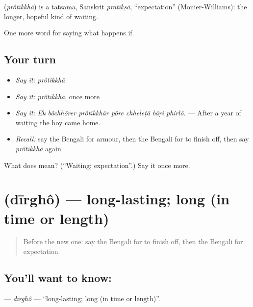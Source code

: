 \begin{cousinweb}
\textbf{} (\emph{prôtīkkhā}) is a tatsama, Sanskrit \emph{pratīkṣā}, \textquotedblleft{}expectation\textquotedblright{} (Monier-Williams): the longer, hopeful kind of waiting.
\end{cousinweb}

\begin{grammarlens}[title={What you've built}]
One more word for saying what happens if.
\end{grammarlens}

\subsection*{Your turn}
\begin{itemize}
\raggedright
  \item \emph{Say it:} \emph{prôtīkkhā}
  \item \emph{Say it:} \emph{prôtīkkhā}, once more
  \item \emph{Say it:} \emph{Ek bôchhôrer prôtīkkhār pôre chheleṭā bāṛi phirlô.} — After a year of waiting the boy came home.
  \item \emph{Recall:} say the Bengali for armour, then the Bengali for to finish off, then say \emph{prôtīkkhā} again
\end{itemize}

\begin{tcolorbox}[breakable,colback=teal!4,colframe=teal!35!black,title={Before you move on}]
What does  mean? (\textquotedblleft{}Waiting; expectation\textquotedblright{}.) Say it once more.
\end{tcolorbox}
\section[\texorpdfstring{\bn{দীর্ঘ} (dīrghô)}{দীর্ঘ (dīrghô)}]{ (dīrghô) — long-lasting; long (in time or length)}

\label{lesson:BN-C541-dirgho}



\begin{quote}
Before the new one: say the Bengali for to finish off, then the Bengali for expectation.
\end{quote}

\subsection*{You'll want to know: }
\textbf{} — \emph{dīrghô} — \textquotedblleft{}long-lasting; long (in time or length)\textquotedblright{}.

